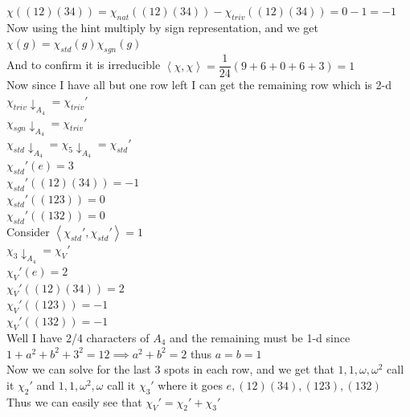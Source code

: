 \documentclass[12pt, letterpaper]{article}
\theoremstyle{definition}
\newcommand{\ang}[1]{\left\langle #1 \right\rangle}
\begin{document}
$\chi((12)(34))=\chi_{nat}((12)(34))-\chi_{triv}((12)(34))=0-1=-1$\\
Now using the hint multiply by sign representation, and we get $\chi(g)=\chi_{std}(g)\chi_{sgn}(g)$\\
And to confirm it is irreducible $\ang{\chi,\chi}=\dfrac{1}{24}(9+6+0+6+3)=1$\\
Now since I have all but one row left I can get the remaining row which is 2-d\\
$\chi_{triv}\downarrow_{A_4}=\chi_{triv}'$\\
$\chi_{sgn}\downarrow_{A_4}=\chi_{triv}'$\\
$\chi_{std}\downarrow_{A_4}=\chi_{5}\downarrow_{A_4}=\chi_{std}'$\\
$\chi_{std}'(e)=3$\\
$\chi_{std}'((12)(34))=-1$\\
$\chi_{std}'((123))=0$\\
$\chi_{std}'((132))=0$\\
Consider $\ang{\chi_{std}',\chi_{std}'}=1$\\
$\chi_{3}\downarrow_{A_4}=\chi_{V}'$\\
$\chi_{V}'(e)=2$\\
$\chi_{V}'((12)(34))=2$\\
$\chi_{V}'((123))=-1$\\
$\chi_{V}'((132))=-1$\\
Well I have 2/4 characters of $A_4$ and the remaining must be 1-d since $1+a^2+b^2+3^2=12 \implies a^2+b^2=2$ thus $a=b=1$\\
Now we can solve for the last 3 spots in each row, and we get that $1,1,\omega,\omega^2$ call it $\chi_2'$ and $1,1,\omega^2,\omega$ call it $\chi_3'$ where it goes $e,(12)(34),(123),(132)$\\
Thus we can easily see that $\chi_{V}'=\chi_{2}'+\chi_{3}'$

\newpage
\end{document}
